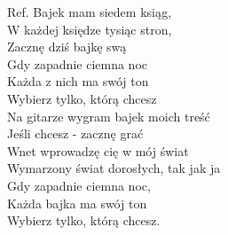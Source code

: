 \begin{flushleft}
\vskip 3mm
Ref. Bajek mam siedem ksiąg,\\
\hspace{0.9cm}W każdej księdze tysiąc stron, \\
\hspace{0.9cm}Zacznę dziś bajkę swą \\
\hspace{0.9cm}Gdy zapadnie ciemna noc \\
\hspace{0.9cm}Każda z nich ma swój ton \\
\hspace{0.9cm}Wybierz tylko, którą chcesz \\
\hspace{0.9cm}Na gitarze wygram bajek moich treść \\
\hspace{0.9cm}Jeśli chcesz - zacznę grać \\
\hspace{0.9cm}Wnet wprowadzę cię w mój świat \\
\hspace{0.9cm}Wymarzony świat dorosłych, tak jak ja \\
\hspace{0.9cm}Gdy zapadnie ciemna noc, \\
\hspace{0.9cm}Każda bajka ma swój ton \\
\hspace{0.9cm}Wybierz tylko, którą chcesz. \\
\end{flushleft}
\clearpage
